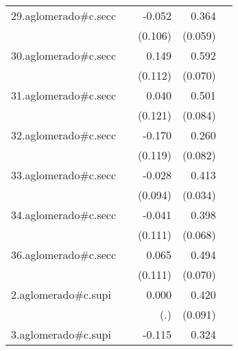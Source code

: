 {\begin{longtable}{l*{4}{D{.}{.}{-1}}}
\addlinespace
29.aglomerado#c.secc&                     &      -0.052         &       0.364\sym{***}&                     \\
            &                     &     (0.106)         &     (0.059)         &                     \\
\addlinespace
30.aglomerado#c.secc&                     &       0.149         &       0.592\sym{***}&                     \\
            &                     &     (0.112)         &     (0.070)         &                     \\
\addlinespace
31.aglomerado#c.secc&                     &       0.040         &       0.501\sym{***}&                     \\
            &                     &     (0.121)         &     (0.084)         &                     \\
\addlinespace
32.aglomerado#c.secc&                     &      -0.170         &       0.260\sym{**} &                     \\
            &                     &     (0.119)         &     (0.082)         &                     \\
\addlinespace
33.aglomerado#c.secc&                     &      -0.028         &       0.413\sym{***}&                     \\
            &                     &     (0.094)         &     (0.034)         &                     \\
\addlinespace
34.aglomerado#c.secc&                     &      -0.041         &       0.398\sym{***}&                     \\
            &                     &     (0.111)         &     (0.068)         &                     \\
\addlinespace
36.aglomerado#c.secc&                     &       0.065         &       0.494\sym{***}&                     \\
            &                     &     (0.111)         &     (0.070)         &                     \\
\addlinespace
2.aglomerado#c.supi&                     &       0.000         &       0.420\sym{***}&                     \\
            &                     &         (.)         &     (0.091)         &                     \\
\addlinespace
3.aglomerado#c.supi&                     &      -0.115         &       0.324\sym{***}&                     \\

\end{longtable}}
